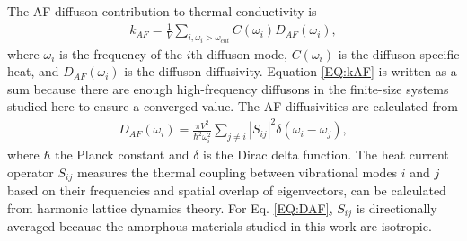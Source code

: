 \documentclass[aps,prb,twocolumn,superscriptaddress,footinbib,amsmath,amssymb,floatfix]{revtex4}
\begin{document}
The AF diffuson contribution to thermal conductivity is
\cite{feldman_thermal_1993,feldman_numerical_1999}
\begin{equation}\label{EQ:kAF}
\begin{split}
k_{AF} = \frac{1}{V}\sum_{i,\omega_i>\omega_{cut}} 
C(\omega_i) D_{AF}(\omega_i), 
\end{split}
\end{equation}
where $\omega_i$ is the frequency of the $i$th diffuson mode, 
$C(\omega_i)$ is the diffuson specific heat, and $D_{AF}(\omega_i)$ 
is the diffuson diffusivity. Equation \eqref{EQ:kAF} is written as a 
sum because there are enough high-frequency diffusons in the 
finite-size systems studied here to ensure a converged 
value.\cite{feldman_thermal_1993,feldman_numerical_1999} 
The AF diffusivities are calculated from\cite{allen_thermal_1993} 
\begin{equation}\label{EQ:DAF}
\begin{split}
D_{AF}(\omega_i) = \frac{\pi V^2}{\hbar^2\omega^2_i}\sum_{j\neq i}
|S_{ij}|^2 \delta(\omega_i - \omega_j),
\end{split}
\end{equation}
where $\hbar$ the Planck constant and $\delta$ is the Dirac delta 
function. The heat current operator $S_{ij}$ measures the thermal 
coupling 
between vibrational modes $i$ and $j$ based on their frequencies and 
spatial overlap of eigenvectors, 
can be calculated from harmonic lattice dynamics theory.
\cite{allen_thermal_1993,feldman_thermal_1993,feldman_numerical_1999} 
For Eq. \eqref{EQ:DAF}, $S_{ij}$ is directionally averaged because 
the amorphous materials studied in this work are isotropic. 

\end{document}
